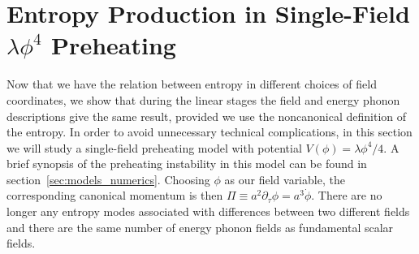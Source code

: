\documentclass[11pt,a4paper]{article}
\begin{document}
\section{Entropy Production in Single-Field $\lambda\phi^4$ Preheating}
\label{sec:entropy_phi4}
Now that we have the relation between entropy in different choices of field coordinates, we show that during the linear stages the field and energy phonon descriptions give the same result, provided we use the noncanonical definition of the entropy.
In order to avoid unnecessary technical complications, in this section we will study a single-field preheating model with potential $V(\phi)=\lambda\phi^4/4$.
A brief synopsis of the preheating instability in this model can be found in section~\ref{sec:models_numerics}.
Choosing $\phi$ as our field variable, the corresponding canonical momentum is then $\Pi \equiv a^2\partial_\tau\phi = a^3\dot{\phi}$.
There are no longer any entropy modes associated with differences between two different fields and there are the same number of energy phonon fields as fundamental scalar fields.
\end{document}
